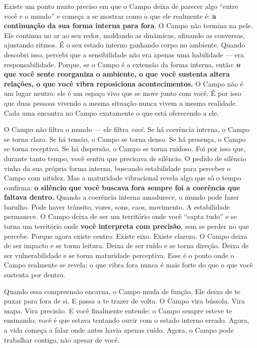 \documentclass[12pt]{book}
\begin{document}
Existe um ponto muito preciso em que o Campo deixa de parecer algo \enquote{entre você e o mundo} e começa a se mostrar como o que ele realmente é: \textbf{a continuação da sua forma interna para fora}. O Campo não termina na pele. Ele continua no ar ao seu redor, moldando as dinâmicas, afinando as conversas, ajustando ritmos. É o seu estado interno ganhando corpo no ambiente. Quando descobri isso, percebi que a sensibilidade não era apenas uma habilidade --- era responsabilidade. Porque, se o Campo é a extensão da forma interna, então: \textbf{o que você sente reorganiza o ambiente, o que você sustenta altera relações, o que você vibra reposiciona acontecimentos.} O Campo não é um lugar neutro: ele é um espaço vivo que se move junto com você. É por isso que duas pessoas vivendo a mesma situação nunca vivem a mesma realidade. Cada uma encontra no Campo exatamente o que está oferecendo a ele.

O Campo não filtra o mundo --- ele filtra \textit{você}. Se há coerência interna, o Campo se torna claro. Se há tensão, o Campo se torna denso. Se há presença, o Campo se torna receptivo. Se há dispersão, o Campo se torna ruidoso. Foi por isso que, durante tanto tempo, você sentiu que precisava de silêncio. O pedido de silêncio vinha da sua própria forma interna, buscando estabilidade para perceber o Campo com nitidez. Mas a maturidade vibracional revela algo que só o tempo confirma: \textbf{o silêncio que você buscava fora sempre foi a coerência que faltava dentro.} Quando a coerência interna amadurece, o mundo pode fazer barulho. Pode haver trânsito, vozes, sons, caos, movimento. A estabilidade permanece. O Campo deixa de ser um território onde você \enquote{capta tudo} e se torna um território onde \textbf{você interpreta com precisão}, sem se perder no que percebe. Porque agora existe centro. Existe eixo. Existe clareza. O Campo deixa de ser impacto e se torna leitura. Deixa de ser ruído e se torna direção. Deixa de ser vulnerabilidade e se torna maturidade perceptiva. Esse é o ponto onde o Campo realmente se revela: o que vibra fora nunca é mais forte do que o que você sustenta por dentro.

Quando essa compreensão encarna, o Campo muda de função. Ele deixa de te puxar para fora de si. E passa a te trazer de volta. O Campo vira bússola. Vira mapa. Vira precisão. E você finalmente entende: o Campo sempre esteve te ensinando; você é que estava tentando ouvir com o estado interno errado. Agora, a vida começa a falar onde antes havia apenas ruído. Agora, o Campo pode trabalhar contigo, não apesar de você.
\end{document}
